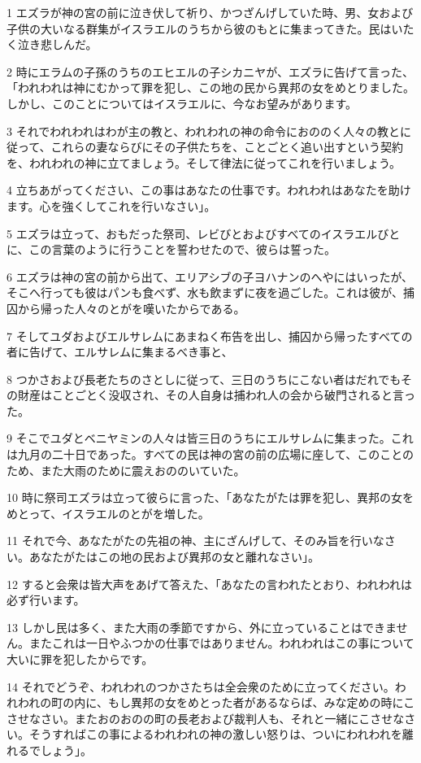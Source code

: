 \par 1 エズラが神の宮の前に泣き伏して祈り、かつざんげしていた時、男、女および子供の大いなる群集がイスラエルのうちから彼のもとに集まってきた。民はいたく泣き悲しんだ。
\par 2 時にエラムの子孫のうちのエヒエルの子シカニヤが、エズラに告げて言った、「われわれは神にむかって罪を犯し、この地の民から異邦の女をめとりました。しかし、このことについてはイスラエルに、今なお望みがあります。
\par 3 それでわれわれはわが主の教と、われわれの神の命令におののく人々の教とに従って、これらの妻ならびにその子供たちを、ことごとく追い出すという契約を、われわれの神に立てましょう。そして律法に従ってこれを行いましょう。
\par 4 立ちあがってください、この事はあなたの仕事です。われわれはあなたを助けます。心を強くしてこれを行いなさい」。
\par 5 エズラは立って、おもだった祭司、レビびとおよびすべてのイスラエルびとに、この言葉のように行うことを誓わせたので、彼らは誓った。
\par 6 エズラは神の宮の前から出て、エリアシブの子ヨハナンのへやにはいったが、そこへ行っても彼はパンも食べず、水も飲まずに夜を過ごした。これは彼が、捕囚から帰った人々のとがを嘆いたからである。
\par 7 そしてユダおよびエルサレムにあまねく布告を出し、捕囚から帰ったすべての者に告げて、エルサレムに集まるべき事と、
\par 8 つかさおよび長老たちのさとしに従って、三日のうちにこない者はだれでもその財産はことごとく没収され、その人自身は捕われ人の会から破門されると言った。
\par 9 そこでユダとベニヤミンの人々は皆三日のうちにエルサレムに集まった。これは九月の二十日であった。すべての民は神の宮の前の広場に座して、このことのため、また大雨のために震えおののいていた。
\par 10 時に祭司エズラは立って彼らに言った、「あなたがたは罪を犯し、異邦の女をめとって、イスラエルのとがを増した。
\par 11 それで今、あなたがたの先祖の神、主にざんげして、そのみ旨を行いなさい。あなたがたはこの地の民および異邦の女と離れなさい」。
\par 12 すると会衆は皆大声をあげて答えた、「あなたの言われたとおり、われわれは必ず行います。
\par 13 しかし民は多く、また大雨の季節ですから、外に立っていることはできません。またこれは一日やふつかの仕事ではありません。われわれはこの事について大いに罪を犯したからです。
\par 14 それでどうぞ、われわれのつかさたちは全会衆のために立ってください。われわれの町の内に、もし異邦の女をめとった者があるならば、みな定めの時にこさせなさい。またおのおのの町の長老および裁判人も、それと一緒にこさせなさい。そうすればこの事によるわれわれの神の激しい怒りは、ついにわれわれを離れるでしょう」。

